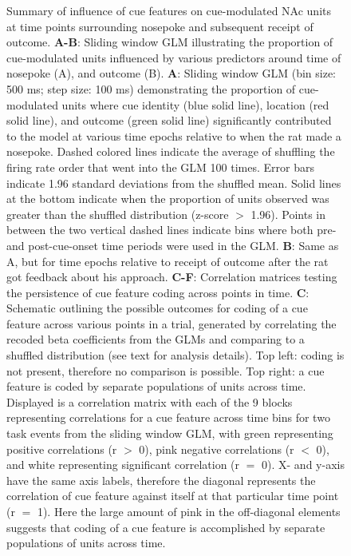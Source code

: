 \documentclass[11pt]{article}
\newcommand{\bsf}[1]{\textbf{#1}}
\begin{document}
\begin{figure}[ht!]
\caption{{\color{red} Summary of influence of cue features on cue-modulated NAc units at time points surrounding nosepoke and subsequent receipt of outcome. \bsf{A-B}: Sliding window GLM illustrating the proportion of cue-modulated units influenced by various predictors around time of nosepoke (A), and outcome (B). \bsf{A}: Sliding window GLM (bin size: 500 ms; step size: 100 ms) demonstrating the proportion of cue-modulated units where cue identity (blue solid line), location (red solid line), and outcome (green solid line) significantly contributed to the model at various time epochs relative to when the rat made a nosepoke. Dashed colored lines indicate the average of shuffling the firing rate order that went into the GLM 100 times. Error bars indicate 1.96 standard deviations from the shuffled mean. Solid lines at the bottom indicate when the proportion of units observed was greater than the shuffled distribution (z-score $>$ 1.96). Points in between the two vertical dashed lines indicate bins where both pre- and post-cue-onset time periods were used in the GLM. \bsf{B}: Same as A, but for time epochs relative to receipt of outcome after the rat got feedback about his approach. \bsf{C-F}: Correlation matrices testing the persistence of cue feature coding across points in time. \bsf{C}: Schematic outlining the possible outcomes for coding of a cue feature across various points in a trial, generated by correlating the recoded beta coefficients from the GLMs and comparing to a shuffled distribution (see text for analysis details). Top left: coding is not present, therefore no comparison is possible. Top right: a cue feature is coded by separate populations of units across time. Displayed is a correlation matrix with each of the 9 blocks representing correlations for a cue feature across time bins for two task events from the sliding window GLM, with green representing positive correlations (r $>$ 0), pink negative correlations (r $<$ 0), and white representing significant correlation (r $=$ 0). X- and y-axis have the same axis labels, therefore the diagonal represents the correlation of cue feature against itself at that particular time point (r $=$ 1). Here the large amount of pink in the off-diagonal elements suggests that coding of a cue feature is accomplished by separate populations of units across time.}}
\label{fig:Q2}
\end{figure} \clearpage
\end{document}
